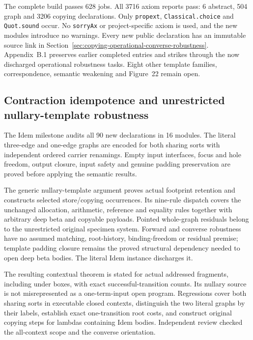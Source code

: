 The complete build passes 628 jobs. All 3716 axiom reports pass: 6 abstract,
504 graph and 3206 copying declarations. Only \texttt{propext},
\texttt{Classical.choice} and \texttt{Quot.sound} occur. No \texttt{sorryAx}
or project-specific axiom is used, and the new modules introduce no warnings.
Every new public declaration has an immutable source link in
Section~\ref{sec:copying-operational-converse-robustness}.
Appendix~B.1 preserves earlier completed entries and strikes through the
now discharged operational robustness tasks. Eight other template families,
correspondence, semantic weakening and Figure~22 remain open.


\subsection{Contraction idempotence and unrestricted nullary-template robustness}
The Idem milestone audits all 90 new declarations in 16 modules. The literal
three-edge and one-edge graphs are encoded for both sharing sorts with
independent ordered carrier renamings. Empty input interfaces, focus and hole
freedom, output closure, input safety and genuine padding preservation are
proved before applying the semantic results.

The generic nullary-template argument proves actual footprint retention and
constructs selected store/copying occurrences. Its nine-rule dispatch covers
the unchanged allocation, arithmetic, reference and equality rules together
with arbitrary deep beta and copyable payloads. Pointed whole-graph residuals
belong to the unrestricted original specimen system. Forward and converse
robustness have no assumed matching, root-history, binding-freedom or residual
premise; template padding closure remains the proved structural dependency
needed to open deep beta bodies. The literal Idem instance discharges it.

The resulting contextual theorem is stated for actual addressed fragments,
including under boxes, with exact successful-transition counts. Its nullary
source is not misrepresented as a one-term-input open program. Regressions
cover both sharing sorts in executable closed contexts, distinguish the two
literal graphs by their labels, establish exact one-transition root costs,
and construct original copying steps for lambdas containing Idem bodies.
Independent review checked the all-context scope and the converse orientation.


